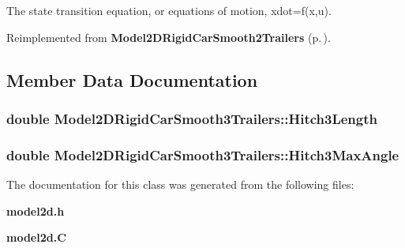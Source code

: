 The state transition equation, or equations of motion, xdot=f(x,u).



Reimplemented from {\bf Model2DRigid\-Car\-Smooth2Trailers} {\rm (p.\,\pageref{classModel2DRigidCarSmooth2Trailers_a2})}.

\subsection{Member Data Documentation}
\subsubsection{\setlength{\rightskip}{0pt plus 5cm}double Model2DRigid\-Car\-Smooth3Trailers::Hitch3Length}\label{classModel2DRigidCarSmooth3Trailers_m0}


\subsubsection{\setlength{\rightskip}{0pt plus 5cm}double Model2DRigid\-Car\-Smooth3Trailers::Hitch3Max\-Angle}\label{classModel2DRigidCarSmooth3Trailers_m1}




The documentation for this class was generated from the following files:\begin{CompactItemize}
\item 
{\bf model2d.h}\item 
{\bf model2d.C}\end{CompactItemize}
